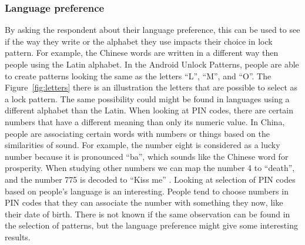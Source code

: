       \subsubsection*{Language preference} By asking the respondent about their language preference, this can be used to see if the way they write or the alphabet they use impacts their choice in lock pattern. For example, the Chinese words are written in a different way then people using the Latin alphabet. In the Android Unlock Patterns, people are able to create patterns looking the same as the letters ``L'', ``M'', and ``O''. The Figure~\ref{fig:letters} there is an illustration the letters that are possible to select as a lock pattern. The same possibility could might be found in languages using a different alphabet than the Latin. When looking at PIN codes, there are certain numbers that have a different meaning than only its numeric value. In China, people are associating certain words with numbers or things based on the similarities of sound. For example, the number eight is considered as a lucky number because it is pronounced ``ba'', which sounds like the Chinese word for prosperity. When studying other numbers we can map the number 4 to ``death'', and the number 775 is decoded to ``Kiss me'' \cite{ChineseChatCodes}. Looking at selection of PIN codes based on people's language is an interesting. People tend to choose numbers in PIN codes that they can associate the number with something they now, like their date of birth. There is not known if the same observation can be found in the selection of patterns, but the language preference might give some interesting results. 

